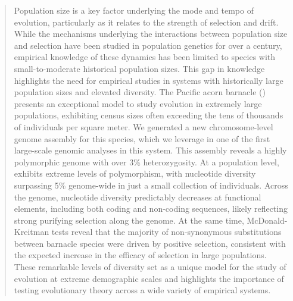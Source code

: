 \begin{abstract}

Population size is a key factor underlying the mode and tempo of evolution,
particularly as it relates to the strength of selection and drift.
While the mechanisms underlying the interactions between population size
and selection have been studied in population genetics for over a century, empirical
knowledge of these dynamics has been limited to species with small-to-moderate
historical population sizes. This gap in knowledge highlights the need for empirical
studies in systems with historically large population sizes and elevated diversity.
The Pacific acorn barnacle (\balgla) presents an exceptional model to study evolution
in extremely large populations, exhibiting census sizes often exceeding the tens of
thousands of individuals per square meter.
We generated a new chromosome-level genome assembly for this species, which we leverage
in one of the first large-scale genomic analyses in this system.
This assembly reveals a highly polymorphic genome with over 3\% heterozygosity.
At a population level, \bgla{} exhibits extreme levels of polymorphism,
with nucleotide diversity surpassing 5\% genome-wide in just a small collection of
individuals.
Across the genome, nucleotide diversity predictably decreases at functional elements,
including both coding and non-coding sequences, likely reflecting strong purifying
selection along the genome.
At the same time, McDonald-Kreitman tests reveal that the majority of non-synonymous
substitutions between barnacle species were driven by positive selection, consistent
with the expected increase in the efficacy of selection in large populations.
These remarkable levels of diversity set \bgla{} as a unique model for the study of
evolution at extreme demographic scales and highlights the importance of testing
evolutionary theory across a wide variety of empirical systems.

\end{abstract}
